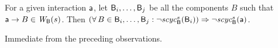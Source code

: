 \item \label{prop:sc-membership:act-out}
For a given interaction $\mathsf{a}$, let $\mathsf{B}_i,\ldots,\mathsf{B}_j$ be all the components $B$ such that $\mathsf{a} \rightarrow B \in \mathit{W}_{\mathsf{B}}({s})$.
Then $(\forall\, B \in \mathsf{B}_i,\ldots,\mathsf{B}_j: \neg \mathit{scyc}_{\mathsf{B}}^{s}({\mathsf{B}_i})) \Rightarrow \neg \mathit{scyc}_{\mathsf{B}}^{s}({\mathsf{a}})$.
\en

\ep
%
\bpr
Immediate from the preceding observations.
\epr



\remove{
\bn



\en 
}

